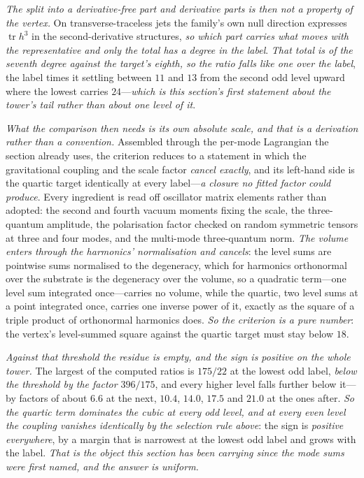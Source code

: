 \documentclass[11pt,a4paper]{article}
\theoremstyle{plain}
\theoremstyle{definition}
\theoremstyle{remark}
\begin{document}
\emph{The split into a derivative-free part and derivative parts is then not a property of the vertex.} On
transverse-traceless jets the family's own null direction expresses $\operatorname{tr}h^{3}$ in the
second-derivative structures, \emph{so which part carries what moves with the representative and only the total
has a degree in the label}. \emph{That total is of the seventh degree against the target's eighth, so the ratio
falls like one over the label}, the label times it settling between $11$ and $13$ from the second odd level
upward where the lowest carries $24$---\emph{which is this section's first statement about the tower's tail
rather than about one level of it}.

\emph{What the comparison then needs is its own absolute scale, and that is a derivation rather than a
convention.} Assembled through the per-mode Lagrangian the section already uses, the criterion reduces to a
statement in which the gravitational coupling and the scale factor \emph{cancel exactly}, and its left-hand side
is the quartic target identically at every label---\emph{a closure no fitted factor could produce}. Every
ingredient is read off oscillator matrix elements rather than adopted: the second and fourth vacuum moments
fixing the scale, the three-quantum amplitude, the polarisation factor checked on random symmetric tensors at
three and four modes, and the multi-mode three-quantum norm. \emph{The volume enters through the harmonics'
normalisation and cancels}: the level sums are pointwise sums normalised to the degeneracy, which for harmonics
orthonormal over the substrate is the degeneracy over the volume, so a quadratic term---one level sum integrated
once---carries no volume, while the quartic, two level sums at a point integrated once, carries one inverse
power of it, exactly as the square of a triple product of orthonormal harmonics
does. \emph{So the criterion is a pure number}: the vertex's level-summed square against the
quartic target must stay below $18$.

\emph{Against that threshold the residue is empty, and the sign is positive on the whole tower.} The largest of
the computed ratios is $175/22$ at the lowest odd label, \emph{below the threshold by the factor $396/175$}, and
every higher level falls further below it---by factors of about $6.6$ at the next, $10.4$, $14.0$, $17.5$ and
$21.0$ at the ones after. \emph{So the quartic term dominates the cubic at every odd level, and at every even level
the coupling vanishes identically by the selection rule above}: the sign is \emph{positive everywhere}, by a margin
that is narrowest at the lowest odd label and grows with the label. \emph{That is the object this section has been carrying since the mode sums were first named, and the
answer is uniform.}
\end{document}
